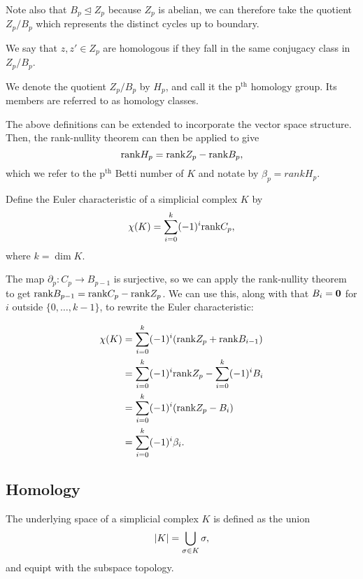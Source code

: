 Note also that $B_p \unlhd Z_p$ because $Z_p$ is abelian, we can therefore take the quotient $Z_p / B_p$ which represents the distinct cycles up to boundary.   

\begin{definition}
    We say that $z, z' \in Z_p$ are homologous if they fall in the same conjugacy class in $Z_p / B_p$.
\end{definition}

We denote the quotient $Z_p / B_p$ by $H_p$, and call it the p$^{\text{th}}$ homology group. Its members are referred to as homology classes.

The above definitions can be extended to incorporate the vector space structure. Then, the rank-nullity theorem can then be applied to give 
$$
\textrm{rank} H_p = \textrm{rank} Z_p - \textrm{rank} B_p,
$$
which we refer to the p$^{\text{th}}$ Betti number of $K$ and notate by $\beta_p = rank H_p$.

\begin{definition}
    Define the Euler characteristic of a simplicial complex $K$ by 
    $$
    \chi(K) = \sum_{i=0}^k (-1)^i \textrm{rank} C_p,
    $$
    where $k = \dim K$.
\end{definition}

The map $\partial_p: C_p \rightarrow B_{p-1}$ is surjective, so we can apply the rank-nullity theorem to get $\textrm{rank} B_{p-1} = \textrm{rank} C_p - \textrm{rank} Z_p$. We can use this, along with that $B_i = \mathbf{0}$ for $i$ outside $\{0, \ldots, k-1\}$, to rewrite the Euler characteristic:

\begin{align*}
    \chi(K) 
    &= \sum_{i=0}^k (-1)^i (\textrm{rank} Z_p + \textrm{rank} B_{i-1}) \\
    &= \sum_{i=0}^k (-1)^i \textrm{rank} Z_p - \sum_{i=0}^k (-1)^i B_{i} \\
    &= \sum_{i=0}^k (-1)^i (\textrm{rank} Z_p - B_{i}) \\
    &= \sum_{i=0}^k (-1)^i \beta_i.
\end{align*}


\subsection{Homology}

\begin{definition}
    The underlying space of a simplicial complex $K$ is defined as the union
    $$
    \lvert K\rvert = \bigcup_{\sigma \in K} \sigma,
    $$
    and equipt with the subspace topology.
\end{definition}

